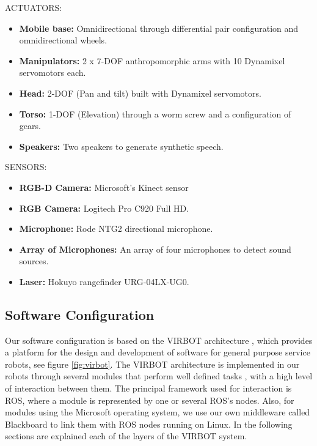 \documentclass{llncs}
\begin{document}
ACTUATORS:

\begin{itemize}
	\item \textbf{Mobile base:} Omnidirectional through differential pair configuration and omnidirectional wheels. 
	\item \textbf{Manipulators:} 2 x 7-DOF anthropomorphic arms with 10 Dynamixel servomotors each.
	\item \textbf{Head:} 2-DOF (Pan and tilt) built with Dynamixel servomotors.
	\item \textbf{Torso:} 1-DOF (Elevation) through a worm screw and a configuration of gears. 
	\item \textbf{Speakers:} Two speakers to generate synthetic speech.
\end{itemize}

SENSORS:

\begin{itemize}
	\item \textbf{RGB-D Camera:} Microsoft's Kinect sensor 
	\item \textbf{RGB Camera:} Logitech Pro C920 Full HD.
	\item \textbf{Microphone:} Rode NTG2 directional microphone.
	\item \textbf{Array of Microphones:} An array of four microphones to detect sound sources.
	\item \textbf{Laser:} Hokuyo rangefinder URG-04LX-UG0.
\end{itemize}

\subsection{Software Configuration}
Our software configuration is based on the VIRBOT architecture \cite{virbot}, 
which provides a platform for the design and development of software for general purpose service robots, see figure \ref{fig:virbot}. 
The VIRBOT architecture is implemented in our robots through several modules that perform well defined tasks \cite{muller}, with a 
high level of interaction between them. The principal framework used for interaction is ROS, where a module is represented by one or 
several ROS's nodes. Also, for modules using the Microsoft operating system, we use our own middleware called Blackboard to
link them with ROS nodes running on Linux.
In the following sections are explained each of the layers of the VIRBOT system.
\end{document}
